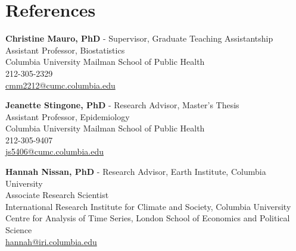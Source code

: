 \documentclass[hidelinks,10pt]{my_cv}
\begin{document}
\section{References}



	\textbf{Christine Mauro, PhD} - Supervisor, Graduate Teaching Assistantship
	\\Assistant Professor, Biostatistics
	\\Columbia University Mailman School of Public Health
	\\212-305-2329	
	\\ \href{mailto:cmm2212@cumc.columbia.edu}{cmm2212@cumc.columbia.edu}

	\vspace{5mm}

	\textbf{Jeanette Stingone, PhD} - Research Advisor, Master's Thesis
	\\ Assistant Professor, Epidemiology 
	\\ Columbia University Mailman School of Public Health  
	\\ 212-305-9407
	\\ \href{mailto:js5406@cumc.columbia.edu}{js5406@cumc.columbia.edu}
	
	\vspace{5mm}

	\textbf{Hannah Nissan, PhD} - Research Advisor, Earth Institute, Columbia University
	\\Associate Research Scientist
	\\International Research Institute for Climate and Society, Columbia University
	\\Centre for Analysis of Time Series, London School of Economics and Political Science
	\\ \href{mailto:hannah@iri.columbia.edu}{hannah@iri.columbia.edu}
\end{document}
